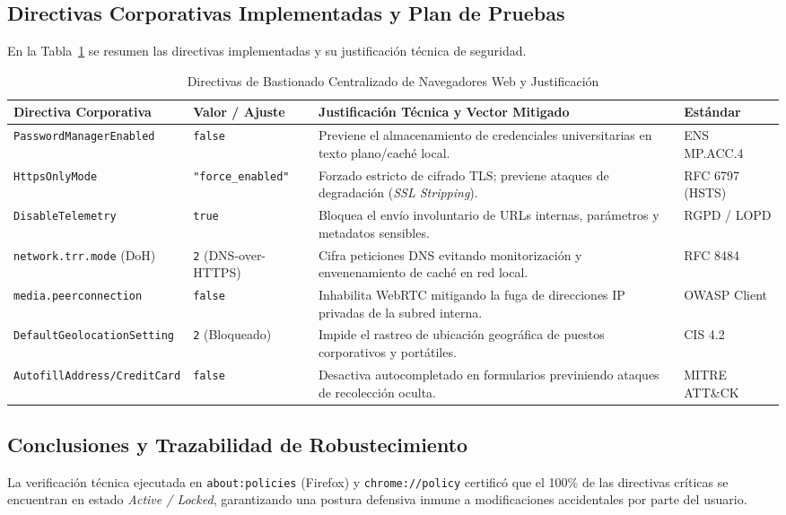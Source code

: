 \documentclass[11pt,a4paper]{article}
\begin{document}
\subsection{Directivas Corporativas Implementadas y Plan de Pruebas}
En la Tabla~\ref{tab:browser_policies} se resumen las directivas implementadas y su justificación técnica de seguridad.

\begin{table}[h!]
\centering
\small
\caption{Directivas de Bastionado Centralizado de Navegadores Web y Justificación}
\label{tab:browser_policies}
\begin{tabularx}{\textwidth}{llXl}
\toprule
\textbf{Directiva Corporativa} & \textbf{Valor / Ajuste} & \textbf{Justificación Técnica y Vector Mitigado} & \textbf{Estándar} \\
\midrule
\texttt{PasswordManagerEnabled} & \texttt{false} & Previene el almacenamiento de credenciales universitarias en texto plano/caché local. & ENS MP.ACC.4 \\
\texttt{HttpsOnlyMode} & \texttt{"force\_enabled"} & Forzado estricto de cifrado TLS; previene ataques de degradación (\textit{SSL Stripping}). & RFC 6797 (HSTS) \\
\texttt{DisableTelemetry} & \texttt{true} & Bloquea el envío involuntario de URLs internas, parámetros y metadatos sensibles. & RGPD / LOPD \\
\texttt{network.trr.mode} (DoH) & \texttt{2} (DNS-over-HTTPS) & Cifra peticiones DNS evitando monitorización y envenenamiento de caché en red local. & RFC 8484 \\
\texttt{media.peerconnection} & \texttt{false} & Inhabilita WebRTC mitigando la fuga de direcciones IP privadas de la subred interna. & OWASP Client \\
\texttt{DefaultGeolocationSetting} & \texttt{2} (Bloqueado) & Impide el rastreo de ubicación geográfica de puestos corporativos y portátiles. & CIS 4.2 \\
\texttt{AutofillAddress/CreditCard} & \texttt{false} & Desactiva autocompletado en formularios previniendo ataques de recolección oculta. & MITRE ATT\&CK \\
\bottomrule
\end{tabularx}
\end{table}

\subsection{Conclusiones y Trazabilidad de Robustecimiento}
La verificación técnica ejecutada en \texttt{about:policies} (Firefox) y \texttt{chrome://policy} certificó que el 100\% de las directivas críticas se encuentran en estado \textit{Active / Locked}, garantizando una postura defensiva inmune a modificaciones accidentales por parte del usuario.
\end{document}
